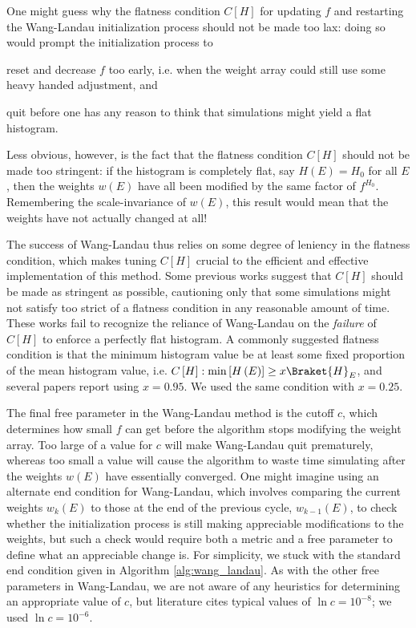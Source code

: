 \documentclass[11pt]{article}
\newcommand{\bk}{\Braket} %
\newcommand{\p}[1]{\left(#1\right)} %
\renewcommand{\sp}[1]{\left[#1\right]} %
\begin{document}
One might guess why the flatness condition $C\sp{H}$ for updating $f$
and restarting the Wang-Landau initialization process should not be
made too lax: doing so would prompt the initialization process to
\begin{enumerate*}[label=\roman*)]
\item reset and decrease $f$ too early, i.e. when the weight array
  could still use some heavy handed adjustment, and
\item quit before one has any reason to think that simulations might
  yield a flat histogram.
\end{enumerate*}
Less obvious, however, is the fact that the flatness condition
$C\sp{H}$ should not be made too stringent: if the histogram is
completely flat, say $H\p{E}=H_0$ for all $E$, then the weights
$w\p{E}$ have all been modified by the same factor of $f^{H_0}$.
Remembering the scale-invariance of $w\p{E}$, this result would mean
that the weights have not actually changed at all!

The success of Wang-Landau thus relies on some degree of leniency in
the flatness condition, which makes tuning $C\sp{H}$ crucial to the
efficient and effective implementation of this method. Some previous
works\cite{wang_landau} suggest that $C\sp{H}$ should be made as
stringent as possible, cautioning only that some simulations might not
satisfy too strict of a flatness condition in any reasonable amount of
time. These works fail to recognize the reliance of Wang-Landau on the
{\it failure} of $C\sp{H}$ to enforce a perfectly flat histogram. A
commonly suggested flatness condition is that the minimum histogram
value be at least some fixed proportion of the mean histogram value,
i.e. $C\sp{H}:\min\sp{H\p{E}}\ge x\bk{H}_E$, and several papers report
using $x=0.95$. We used the same condition with $x=0.25$.

The final free parameter in the Wang-Landau method is the cutoff $c$,
which determines how small $f$ can get before the algorithm stops
modifying the weight array. Too large of a value for $c$ will make
Wang-Landau quit prematurely, whereas too small a value will cause the
algorithm to waste time simulating after the weights $w\p{E}$ have
essentially converged. One might imagine using an alternate end
condition for Wang-Landau, which involves comparing the current
weights $w_k\p{E}$ to those at the end of the previous cycle,
$w_{k-1}\p{E}$, to check whether the initialization process is still
making appreciable modifications to the weights, but such a check
would require both a metric and a free parameter to define what an
appreciable change is. For simplicity, we stuck with the standard end
condition given in Algorithm \ref{alg:wang_landau}. As with the other
free parameters in Wang-Landau, we are not aware of any heuristics for
determining an appropriate value of $c$, but literature cites typical
values of $\ln c=10^{-8}$; we used $\ln c=10^{-6}$.
\end{document}
